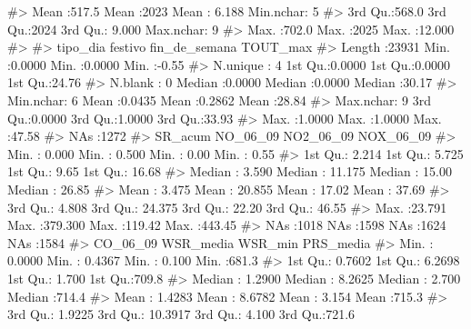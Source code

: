 \documentclass[
  spanish,
  letterpaper,
  DIV=11,
  numbers=noendperiod]{scrartcl}
\newenvironment{Shaded}{\begin{snugshade}}{\end{snugshade}}
\newcommand{\CommentTok}[1]{\textcolor[rgb]{0.37,0.37,0.37}{#1}}
\begin{document}
\begin{Shaded}
\begin{Highlighting}[]
\CommentTok{\#\textgreater{}  Mean   :517.5   Mean   :2023   Mean   : 6.188   Min.nchar:    5  }
\CommentTok{\#\textgreater{}  3rd Qu.:568.0   3rd Qu.:2024   3rd Qu.: 9.000   Max.nchar:    9  }
\CommentTok{\#\textgreater{}  Max.   :702.0   Max.   :2025   Max.   :12.000                    }
\CommentTok{\#\textgreater{}                                                                   }
\CommentTok{\#\textgreater{}       tipo\_dia        festivo       fin\_de\_semana       TOUT\_max    }
\CommentTok{\#\textgreater{}  Length   :23931   Min.   :0.0000   Min.   :0.0000   Min.   :{-}0.55  }
\CommentTok{\#\textgreater{}  N.unique :    4   1st Qu.:0.0000   1st Qu.:0.0000   1st Qu.:24.76  }
\CommentTok{\#\textgreater{}  N.blank  :    0   Median :0.0000   Median :0.0000   Median :30.17  }
\CommentTok{\#\textgreater{}  Min.nchar:    6   Mean   :0.0435   Mean   :0.2862   Mean   :28.84  }
\CommentTok{\#\textgreater{}  Max.nchar:    9   3rd Qu.:0.0000   3rd Qu.:1.0000   3rd Qu.:33.93  }
\CommentTok{\#\textgreater{}                    Max.   :1.0000   Max.   :1.0000   Max.   :47.58  }
\CommentTok{\#\textgreater{}                                                      NAs    :1272   }
\CommentTok{\#\textgreater{}     SR\_acum          NO\_06\_09         NO2\_06\_09        NOX\_06\_09     }
\CommentTok{\#\textgreater{}  Min.   : 0.000   Min.   :  0.500   Min.   :  0.00   Min.   :  0.55  }
\CommentTok{\#\textgreater{}  1st Qu.: 2.214   1st Qu.:  5.725   1st Qu.:  9.65   1st Qu.: 16.68  }
\CommentTok{\#\textgreater{}  Median : 3.590   Median : 11.175   Median : 15.00   Median : 26.85  }
\CommentTok{\#\textgreater{}  Mean   : 3.475   Mean   : 20.855   Mean   : 17.02   Mean   : 37.69  }
\CommentTok{\#\textgreater{}  3rd Qu.: 4.808   3rd Qu.: 24.375   3rd Qu.: 22.20   3rd Qu.: 46.55  }
\CommentTok{\#\textgreater{}  Max.   :23.791   Max.   :379.300   Max.   :119.42   Max.   :443.45  }
\CommentTok{\#\textgreater{}  NAs    :1018     NAs    :1598      NAs    :1624     NAs    :1584    }
\CommentTok{\#\textgreater{}     CO\_06\_09         WSR\_media           WSR\_min          PRS\_media    }
\CommentTok{\#\textgreater{}  Min.   : 0.0000   Min.   :  0.4367   Min.   :  0.100   Min.   :681.3  }
\CommentTok{\#\textgreater{}  1st Qu.: 0.7602   1st Qu.:  6.2698   1st Qu.:  1.700   1st Qu.:709.8  }
\CommentTok{\#\textgreater{}  Median : 1.2900   Median :  8.2625   Median :  2.700   Median :714.4  }
\CommentTok{\#\textgreater{}  Mean   : 1.4283   Mean   :  8.6782   Mean   :  3.154   Mean   :715.3  }
\CommentTok{\#\textgreater{}  3rd Qu.: 1.9225   3rd Qu.: 10.3917   3rd Qu.:  4.100   3rd Qu.:721.6  }

\end{Highlighting}
\end{Shaded}
\end{document}
